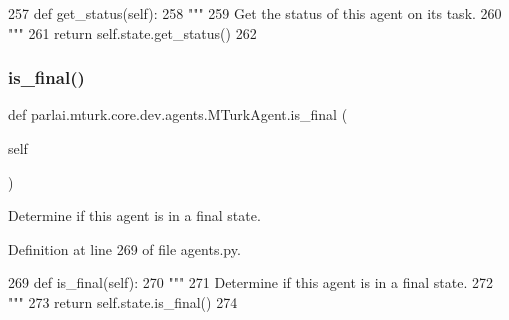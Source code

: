 \begin{DoxyCode}
257     \textcolor{keyword}{def }get\_status(self):
258         \textcolor{stringliteral}{"""}
259 \textcolor{stringliteral}{        Get the status of this agent on its task.}
260 \textcolor{stringliteral}{        """}
261         \textcolor{keywordflow}{return} self.state.get\_status()
262 
\end{DoxyCode}
\mbox{\label{classparlai_1_1mturk_1_1core_1_1dev_1_1agents_1_1MTurkAgent_a07577b6f15ab8b64d2bd2aba87a5e011}} 
\subsubsection{\texorpdfstring{is\+\_\+final()}{is\_final()}}
{\footnotesize\ttfamily def parlai.\+mturk.\+core.\+dev.\+agents.\+M\+Turk\+Agent.\+is\+\_\+final (\begin{DoxyParamCaption}\item[{}]{self }\end{DoxyParamCaption})}

\begin{DoxyVerb}Determine if this agent is in a final state.
\end{DoxyVerb}
 

Definition at line 269 of file agents.\+py.


\begin{DoxyCode}
269     \textcolor{keyword}{def }is\_final(self):
270         \textcolor{stringliteral}{"""}
271 \textcolor{stringliteral}{        Determine if this agent is in a final state.}
272 \textcolor{stringliteral}{        """}
273         \textcolor{keywordflow}{return} self.state.is\_final()
274 
\end{DoxyCode}
\mbox{\label{classparlai_1_1mturk_1_1core_1_1dev_1_1agents_1_1MTurkAgent_a041a1bf11cb466ca9e270c4e423f2a9c}} 
